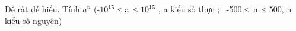 Đề rất dễ hiểu. Tính $a^{n}$ (-$10^{1}$$^ 5 $ ≤ a ≤ $10^{1}$$^ 5 $ , a kiểu số thực ;  -500 ≤ n ≤ 500, n kiểu số nguyên)